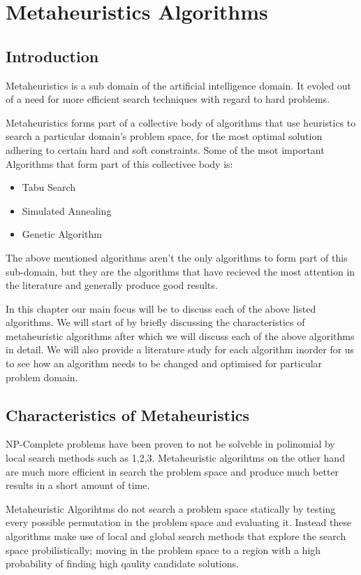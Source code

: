 \chapter{Metaheuristics Algorithms}

\section{Introduction}
Metaheuristics is a sub domain of the artificial intelligence domain. It evoled out of a need for more efficient search techniques with regard to hard problems. 

Metaheuristics forms part of a collective body of algorithms that use heuristics to search a particular domain's problem space, for the most optimal solution adhering to certain hard and soft constraints. Some of the msot important Algorithms that form part of this collectivee body is:
\begin{itemize}
\item Tabu Search
\item Simulated Annealing
\item Genetic Algorithm
\end{itemize}
The above mentioned algorithms aren't the only algorithms to form part of this sub-domain, but they are the algorithms that have recieved the most attention in the literature and generally produce good results.

In this chapter our main focus will be to discuss each of the above listed algorithms. We will start of by briefly discussing the characteristics of metaheuristic algorithms after which we will discuss each of the above algorithms in detail. We will also provide a literature study for each algorithm inorder for us to see how an algorithm needs to be changed and optimised for particular problem domain. 

\section{Characteristics of Metaheuristics}
NP-Complete problems have been proven to not be solveble in polinomial by local search methods such as 1,2,3. Metaheuristic algorihtms on the other hand are much more efficient in search the problem space and produce much better results in a short amount of time.

Metaheuristic Algorihtms do not search a problem space statically by testing every possible permutation in the problem space and evaluating it. Instead these algorithms make use of local and global search methods that explore the search space probilistically; moving in the problem space to a region with a high probability of finding high qaulity candidate solutions.
